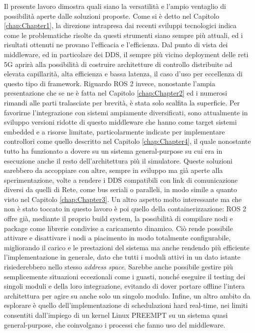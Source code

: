 \indent Il presente lavoro dimostra quali siano la versatilità e l'ampio ventaglio di possibilità aperte dalle soluzioni proposte. Come si è detto nel Capitolo \ref{chap:Chapter1}, la direzione intrapresa dai recenti sviluppi tecnologici indica come le problematiche risolte da questi strumenti siano sempre più attuali, ed i risultati ottenuti ne provano l'efficacia e l'efficienza. Dal punto di vista dei middleware, ed in particolare dei DDS, il sempre più vicino deployment delle reti 5G aprirà alla possibilità di costruire architetture di controllo distribuite ad elevata capillarità, alta efficienza e bassa latenza, il caso d'uso per eccellenza di questo tipo di framework. Riguardo ROS 2 invece, nonostante l'ampia presentazione che se ne è fatta nel Capitolo \ref{chap:Chapter2} ed i numerosi rimandi alle parti tralasciate per brevità, è stata solo scalfita la superficie. Per favorirne l'integrazione con sistemi ampiamente diversificati, sono attualmente in sviluppo versioni ridotte di questo middleware che hanno come target sistemi embedded e a risorse limitate, particolarmente indicate per implementare controllori come quello descritto nel Capitolo \ref{chap:Chapter4}, il quale nonostante tutto ha funzionato a dovere su un sistema general-purpose su cui era in esecuzione anche il resto dell'architettura più il simulatore. Queste soluzioni sarebbero da accoppiare con altre, sempre in sviluppo ma già aperte alla sperimentazione, volte a rendere i DDS compatibili con link di comunicazione diversi da quelli di Rete, come bus seriali o paralleli, in modo simile a quanto visto nel Capitolo \ref{chap:Chapter3}. Un altro aspetto molto interessante ma che non è stato toccato in questo lavoro è poi quello della containerizzazione: ROS 2 offre già, mediante il proprio build system, la possibilità di compilare nodi e package come librerie condivise a caricamento dinamico. Ciò rende possibile attivare e disattivare i nodi a piacimento in modo totalmente configurabile, migliorando il carico e le prestazioni del sistema ma anche rendendo più efficiente l'implementazione in generale, dato che tutti i moduli attivi in un dato istante risiederebbero nello stesso \emph{address space}. Sarebbe anche possibile gestire più semplicemente situazioni eccezionali come i guasti, nonché eseguire il testing dei singoli moduli e della loro integrazione, evitando di dover portare offline l'intera architettura per agire su anche solo un singolo modulo. Infine, un altro ambito da esplorare è quello dell'implementazione di schedulazioni hard real-time, nei limiti consentiti dall'impiego di un kernel Linux PREEMPT su un sistema quasi general-purpose, che coinvolgano i processi che fanno uso del middleware.
